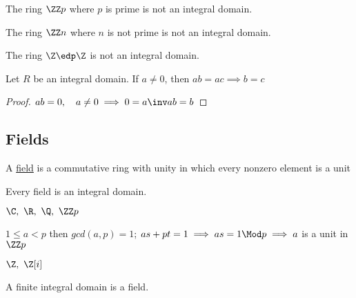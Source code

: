 \begin{example}
  The ring \(\ZZ p\) where \(p\) is prime is not an integral domain.
\end{example}

\begin{nonexample}
  The ring \(\ZZ n\) where \(n\) is not prime is not an integral domain.
\end{nonexample}

\begin{nonexample}
  The ring \(\Z \edp \Z\) is not an integral domain.
\end{nonexample}

\begin{theorem}[Cancellation]
  Let \(R\) be an integral domain. If \(a\neq 0\), then \(ab=ac\implies b=c\)
\end{theorem}

\begin{proof}
  \(ab = 0,\quad a\neq 0 \implies 0=a\inv ab = b\)
\end{proof}

\subsection{Fields}
\begin{definition}[Field]
  A \ul{field} is a commutative ring with unity in which every nonzero element is a unit
\end{definition}

\begin{fact}
  Every field is an integral domain.
\end{fact}

\begin{examples}
  \(\C,\ \R,\ \Q,\ \ZZ p\)
  \begin{note}[\(\ZZ p\)]
    \(1\leq a < p\) then \(gcd(a,p) = 1\); \(as+pt=1 \implies as = 1 \Mod p \implies a\) is a unit in \(\ZZ p\)
  \end{note}
\end{examples}

\begin{nonexamples}
  \(\Z,\ \Z[i]\)
\end{nonexamples}

\begin{theorem}
  A finite integral domain is a field.
\end{theorem}

